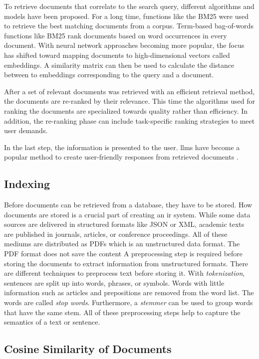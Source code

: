 \documentclass[../main.tex]{subfiles}
\begin{document}
To retrieve documents that correlate to the search query,
different algorithms and models have been proposed.
For a long time, functions like the BM25 \cite{Robertson2009}
were used to retrieve the best matching documents from a corpus.
Term-based bag-of-words functions like BM25 rank documents based on word occurrences in every document.
With neural network approaches becoming more popular,
the focus has shifted toward mapping documents to high-dimensional vectors called embeddings.
A similarity matrix can then be used to calculate the distance between to embeddings corresponding to the query and a document.

After a set of relevant documents was retrieved with an efficient retrieval method,
the documents are re-ranked by their relevance.
This time the algorithms used for ranking the documents are specialized towards quality rather than efficiency.
In addition, the re-ranking phase can include task-specific ranking strategies to meet user demands.

In the last step, the information is presented to the user.
\Glspl{llm} have become a popular method to create user-friendly responses from retrieved documents \cite{zotero-197}.

\subsection{Indexing}

Before documents can be retrieved from a database,
they have to be stored.
How documents are stored is a crucial part of creating an \gls{ir} system.
While some data sources are delivered in structured formats like JSON or XML,
academic texts are published in journals, articles, or conference proceedings.
All of these mediums are distributed as PDFs which is an unstructured data format.
The PDF format does not save the content
A preprocessing step is required before storing the documents to extract information from unstructured formats.
There are different techniques to preprocess text before storing it.
With \emph{tokenization}, sentences are split up into words, phrases, or symbols.
Words with little information such as articles and prepositions are removed from the word list.
The words are called \emph{stop words}.
Furthermore, a \emph{stemmer} can be used to group words that have the same stem.
All of these preprocessing steps help to capture the semantics of a text or sentence.

\subsection{Cosine Similarity of Documents}
\end{document}

